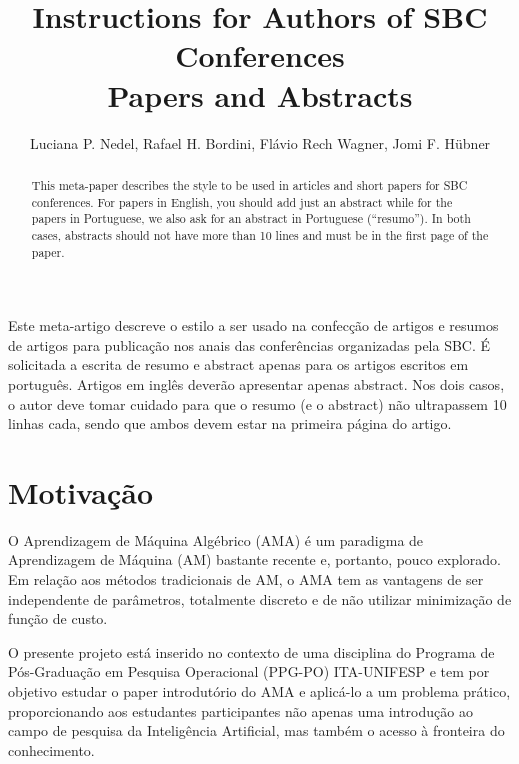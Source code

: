 \documentclass[12pt]{article}
\title{Instructions for Authors of SBC Conferences\\ Papers and Abstracts}
\author{Luciana P. Nedel\inst{1}, Rafael H. Bordini\inst{2}, Flávio Rech
  Wagner\inst{1}, Jomi F. Hübner\inst{3} }
\begin{document}
 

\maketitle

\begin{abstract}
  This meta-paper describes the style to be used in articles and short papers
  for SBC conferences. For papers in English, you should add just an abstract
  while for the papers in Portuguese, we also ask for an abstract in
  Portuguese (``resumo''). In both cases, abstracts should not have more than
  10 lines and must be in the first page of the paper.
\end{abstract}
     
\begin{resumo} 
  Este meta-artigo descreve o estilo a ser usado na confecção de artigos e
  resumos de artigos para publicação nos anais das conferências organizadas
  pela SBC. É solicitada a escrita de resumo e abstract apenas para os artigos
  escritos em português. Artigos em inglês deverão apresentar apenas abstract.
  Nos dois casos, o autor deve tomar cuidado para que o resumo (e o abstract)
  não ultrapassem 10 linhas cada, sendo que ambos devem estar na primeira
  página do artigo.
\end{resumo}


\section{Motivação}

O Aprendizagem de Máquina Algébrico (AMA) é um paradigma de Aprendizagem de Máquina (AM) bastante recente e, portanto, pouco explorado. Em relação aos métodos tradicionais de AM, o AMA tem as vantagens de ser independente de parâmetros, totalmente discreto e de não utilizar minimização de função de custo.

O presente projeto está inserido no contexto de uma disciplina do Programa de Pós-Graduação em Pesquisa Operacional (PPG-PO) ITA-UNIFESP e tem por objetivo estudar o paper introdutório do AMA e aplicá-lo a um problema prático, proporcionando aos estudantes participantes não apenas uma introdução ao campo de pesquisa da Inteligência Artificial, mas também o acesso à fronteira do conhecimento.

\end{document}
